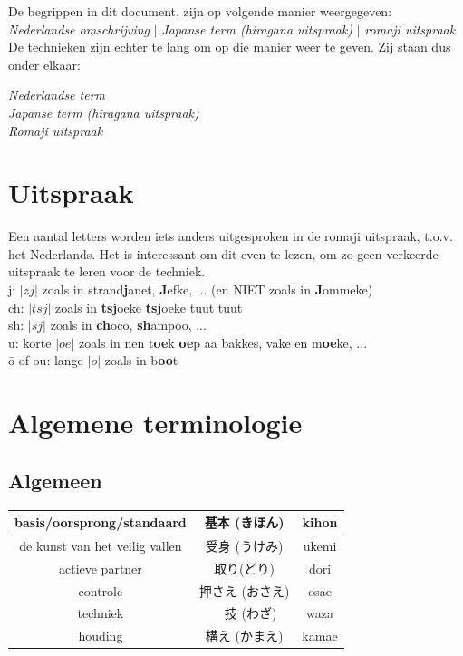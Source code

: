 \documentclass[12pt]{scrartcl}
\begin{document}
\begin{CJK*}{UTF8}{min}
\noindent De begrippen in dit document, zijn op volgende manier weergegeven:\\

\textit{Nederlandse omschrijving} $|$ \textit{Japanse term (hiragana uitspraak)} $|$ \textit{romaji uitspraak}\\

\noindent De technieken zijn echter te lang om op die manier weer te geven. Zij staan dus onder elkaar:\\

\begin{center}
\textit{Nederlandse term}\\
\textit{Japanse term (hiragana uitspraak)}\\
\textit{Romaji uitspraak}
\end{center}

\section{Uitspraak}
\noindent Een aantal letters worden iets anders uitgesproken in de romaji uitspraak, t.o.v. het Nederlands.
Het is interessant om dit even te lezen, om zo geen verkeerde uitspraak te leren voor de techniek.\\

\noindent j: $|zj|$ zoals in strand\textbf{j}anet, \textbf{J}efke, ... (en NIET zoals in \textbf{J}ommeke)\\
ch: $|tsj|$ zoals in \textbf{tsj}oeke \textbf{tsj}oeke tuut tuut\\
sh: $|sj|$ zoals in \textbf{ch}oco, \textbf{sh}ampoo, ...\\
u: korte $|oe|$ zoals in nen t\textbf{oe}k \textbf{oe}p aa bakkes, vake en m\textbf{oe}ke, ...\\
\={o} of ou: lange $|o|$ zoals in b\textbf{oo}t

\section{Algemene terminologie}
\subsection{Algemeen}
\begin{table}[H]
\begin{center}
\begin{tabular}{c|c|c}
basis/oorsprong/standaard & 基本 (きほん) & kihon \\
\hline
de kunst van het veilig vallen & 受身 (うけみ) & ukemi \\
\hline
actieve partner & 取り(どり) & dori\\
\hline
controle & 押さえ (おさえ) & osae\\
\hline
techniek &　技 (わざ) & waza\\
\hline
houding & 構え (かまえ) & kamae 
\end{tabular}
\end{center}
\end{table}


\end{CJK*}
\end{document}
